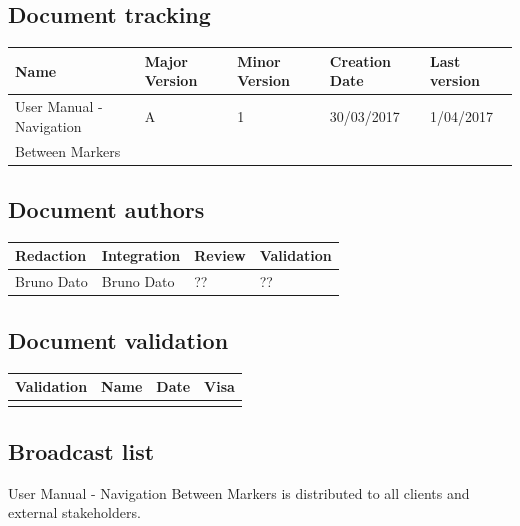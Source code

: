 \documentclass[10pt,a4paper]{article}
\begin{document}
\newpage


\subsection*{Document tracking}

\begin{center}
    \begin{tabular}{| l | l | l | l | l |}
    \hline
     \rowcolor{gray} Name & Major Version & Minor Version & Creation Date & Last version \\ \hline
    User Manual - Navigation & A & 1 & 30/03/2017 & 1/04/2017 \\ 
    Between Markers &  &  &  &  \\ \hline
    \end{tabular}
\end{center}


\subsection*{Document authors}

\begin{center}
    \begin{tabular}{| l | l | l | l |}
    \hline
    \rowcolor{gray} Redaction & Integration & Review & Validation \\ \hline
    Bruno Dato & Bruno Dato & ?? & ?? \\  \hline
    \end{tabular}
\end{center}

\subsection*{Document validation}

\begin{center}
    \begin{tabular}{| l | l | l | l |}
    \hline
     \rowcolor{gray} Validation & Name & Date & Visa \\ \hline
    & & & \\
     \hline
    \end{tabular}
\end{center}

\subsection*{Broadcast list}

User Manual - Navigation Between Markers is distributed to all clients and external stakeholders.
\end{document}
